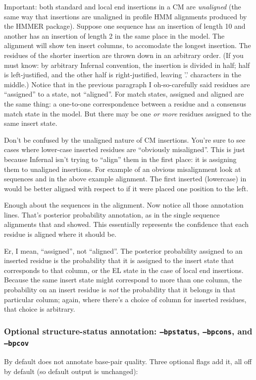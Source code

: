 Important: both standard and local end insertions in a CM are
\emph{unaligned} (the same way that insertions are unaligned in
profile HMM alignments produced by the HMMER package). Suppose one
sequence has an insertion of length 10 and another has an insertion of
length 2 in the same place in the model. The alignment will show ten
insert columns, to accomodate the longest insertion.  The residues of
the shorter insertion are thrown down in an arbitrary order. (If you
must know: by arbitrary Infernal convention, the insertion is divided
in half; half is left-justified, and the other half is
right-justified, leaving '.' characters in the middle.)  Notice that
in the previous paragraph I oh-so-carefully said residues are
``assigned'' to a state, not ``aligned''. For match states, assigned
and aligned are the same thing: a one-to-one correspondence between a
residue and a consensus match state in the model. But there may be one
\emph{or more} residues assigned to the same insert state.

Don't be confused by the unaligned nature of CM insertions. You're
sure to see cases where lower-case inserted residues are ``obviously
misaligned''. This is just because Infernal isn't trying to ``align''
them in the first place: it is assigning them to unaligned
insertions. For example of an obvious misalignment look at sequences
 and  in the above example
alignment. The first inserted (lowercase)  in
 would be better aligned with respect to
 if it were placed one position to the left.

Enough about the sequences in the alignment. Now notice all those
 annotation lines. That's posterior probability annotation,
as in the single sequence alignments that  and
 showed. This essentially represents the confidence
that each residue is aligned where it should be.

Er, I mean, ``assigned'', not ``aligned''. The posterior probability
assigned to an inserted residue is the probability that it is assigned
to the insert state that corresponds to that column, or the EL state
in the case of local end insertions. Because the same insert state
might correspond to more than one column, the probability on an insert
residue is \emph{not} the probability that it belongs in that
particular column; again, where there's a choice of column for
inserted residues, that choice is arbitrary.

\subsubsection{Optional structure-status annotation: \texttt{--bpstatus}, \texttt{--bpcons}, and \texttt{--bpcov}}
\label{section:cmalign-bpstatus}
By default  does not annotate base-pair quality. Three optional
flags add it, all off by default (so default output is unchanged):

